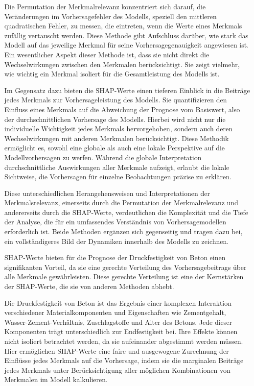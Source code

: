 Die Permutation der Merkmalrelevanz konzentriert sich darauf, die Veränderungen im Vorhersagefehler des Modells, 
speziell den mittleren quadratischen Fehler, zu messen, die eintreten, wenn die Werte eines Merkmals zufällig vertauscht werden. 
Diese Methode gibt Aufschluss darüber, wie stark das Modell auf das jeweilige Merkmal für seine Vorhersagegenauigkeit angewiesen ist. 
Ein wesentlicher Aspekt dieser Methode ist, dass sie nicht direkt die Wechselwirkungen zwischen den Merkmalen berücksichtigt. 
Sie zeigt vielmehr, wie wichtig ein Merkmal isoliert für die Gesamtleistung des Modells ist.

Im Gegensatz dazu bieten die SHAP-Werte einen tieferen Einblick in die Beiträge jedes Merkmals zur Vorhersageleistung des Modells. 
Sie quantifizieren den Einfluss eines Merkmals auf die Abweichung der Prognose vom Basiswert, also der durchschnittlichen Vorhersage des Modells. 
Hierbei wird nicht nur die individuelle Wichtigkeit jedes Merkmals hervorgehoben, sondern auch deren Wechselwirkungen mit anderen 
Merkmalen berücksichtigt. Diese Methodik ermöglicht es, sowohl eine globale als auch eine lokale Perspektive auf die Modellvorhersagen zu werfen. 
Während die globale Interpretation durchschnittliche Auswirkungen aller Merkmale aufzeigt, erlaubt die lokale Sichtweise, die Vorhersagen 
für einzelne Beobachtungen präzise zu erklären.

Diese unterschiedlichen Herangehensweisen und Interpretationen der Merkmalsrelevanz, einerseits durch die 
Permutation der Merkmalrelevanz und andererseits durch die SHAP-Werte, verdeutlichen die Komplexität und die Tiefe der Analyse, 
die für ein umfassendes Verständnis von Vorhersagemodellen erforderlich ist. Beide Methoden ergänzen sich gegenseitig und tragen dazu bei, 
ein vollständigeres Bild der Dynamiken innerhalb des Modells zu zeichnen.

SHAP-Werte bieten für die Prognose der Druckfestigkeit von Beton einen signifikanten Vorteil, 
da sie eine gerechte Verteilung des Vorhersagebeitrags über alle Merkmale gewährleisten. 
Diese gerechte Verteilung ist eine der Kernstärken der 
SHAP-Werte, die sie von anderen Methoden abhebt.

Die Druckfestigkeit von Beton ist das Ergebnis einer komplexen Interaktion verschiedener 
Materialkomponenten und Eigenschaften wie Zementgehalt, Wasser-Zement-Verhältnis, 
Zuschlagstoffe und Alter des Betons. Jede dieser Komponenten trägt unterschiedlich 
zur Endfestigkeit bei. Ihre Effekte können nicht isoliert betrachtet werden, 
da sie aufeinander abgestimmt werden müssen. Hier ermöglichen SHAP-Werte eine faire und ausgewogene 
Zurechnung der Einflüsse jedes Merkmals auf die Vorhersage, indem sie die marginalen 
Beiträge jedes Merkmals unter Berücksichtigung aller möglichen Kombinationen von Merkmalen 
im Modell kalkulieren.

